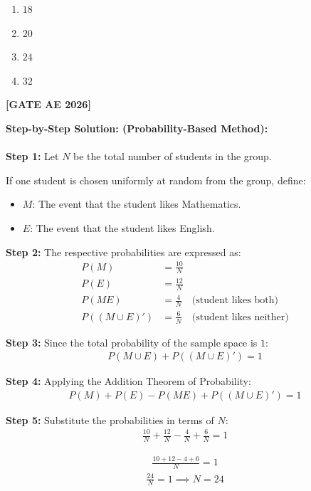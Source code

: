 \documentclass[journal,12pt,onecolumn]{IEEEtran}
\newcommand{\brak}[1]{\left(#1\right)}
\theoremstyle{remark}
\begin{document}
\begin{enumerate}
    \item $18$
    \item $20$
    \item $24$
    \item $32$
\end{enumerate} \hfill \textbf{[GATE AE 2026]}


\noindent \textbf{Step-by-Step Solution: (Probability-Based Method):}\\ \\

\noindent\textbf{Step 1:} Let $N$ be the total number of students in the group. 

\noindent If one student is chosen uniformly at random from the group, define:
\begin{itemize}
    \item $M$: The event that the student likes Mathematics.
    \item $E$: The event that the student likes English.
\end{itemize}

 \noindent\textbf{Step 2:} The respective probabilities are expressed as:
\begin{align}
P\brak{M} &= \frac{10}{N} \\
P\brak{E} &= \frac{12}{N} \\
P\brak{ME} &= \frac{4}{N} \quad \text{(student likes both)} \\
P\brak{\brak{M \cup E}'} &= \frac{6}{N} \quad \text{(student likes neither)}
\end{align}

\noindent\textbf{Step 3:} Since the total probability of the sample space is $1$:
\begin{align}
P\brak{M \cup E} + P\brak{\brak{M \cup E}'} = 1
\end{align}

\noindent\textbf{Step 4:} Applying the Addition Theorem of Probability:
\begin{align}
P\brak{M} + P\brak{E} - P\brak{ME} + P\brak{\brak{M \cup E}'} = 1
\end{align}

\noindent\textbf{Step 5:} Substitute the probabilities in terms of $N$:
\begin{align}
\frac{10}{N} + \frac{12}{N} - \frac{4}{N} + \frac{6}{N} = 1
\end{align}

\begin{align}
\frac{10 + 12 - 4 + 6}{N} = 1
\end{align}
\begin{align}
\frac{24}{N} = 1 \implies N = 24
\end{align}
\end{document}
